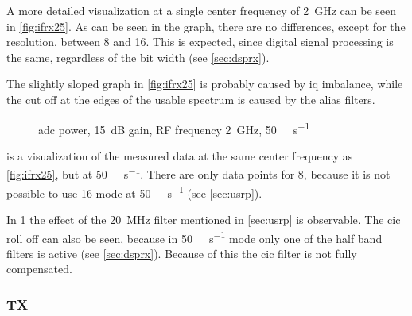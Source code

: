 \documentclass[12pt,a4paper,parskip=full,abstracton]{scrartcl}
\begin{document}
A more detailed visualization at a single center frequency of \SI{2}{\giga\hertz}
can be seen in \cref{fig:ifrx25}. As can be seen in the graph, there are no
differences, except for the resolution, between \SI{8}{\bit} and \SI{16}{\bit}. This
is expected, since digital signal processing is the same, regardless of the bit width
(see \cref{sec:dsprx}).

The slightly sloped graph in \cref{fig:ifrx25} is probably caused by \gls{iq} imbalance,
while the cut off at the edges of the usable spectrum is caused by the alias filters.

\begin{figure}[htb]
    \centering
{}
    \caption{\gls{adc} power, \SI{15}{\deci\bel} gain, RF frequency \SI{2}{\giga\hertz}, \SI{50}{\mega\samples\per\second}}
    \label{fig:ifrx50}
\end{figure}

 is a visualization of the measured data at the same center frequency
as \cref{fig:ifrx25}, but at \SI{50}{\mega\samples\per\second}. There are only
data points for \SI{8}{\bit}, because it is not possible to use \SI{16}{\bit} mode
at \SI{50}{\mega\samples\per\second} (see \cref{sec:usrp}).

In \cref{fig:ifrx50} the effect of the \SI{20}{\mega\hertz} filter mentioned in
\cref{sec:usrp} is observable. The \gls{cic} roll off can also be seen, because
in \SI{50}{\mega\samples\per\second} mode only one of the half band filters is
active (see \cref{sec:dsprx}). Because of this the \gls{cic} filter is not
fully compensated.

\subsubsection{TX}
\end{document}
